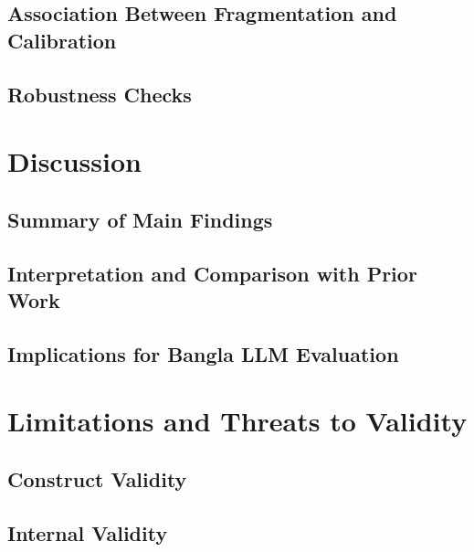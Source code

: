 \documentclass[runningheads]{llncs}
\begin{document}
\subsection{Association Between Fragmentation and Calibration}

\subsection{Robustness Checks}

\section{Discussion}
\subsection{Summary of Main Findings}

\subsection{Interpretation and Comparison with Prior Work}

\subsection{Implications for Bangla LLM Evaluation}

\section{Limitations and Threats to Validity}
\subsection{Construct Validity}

\subsection{Internal Validity}
\end{document}
